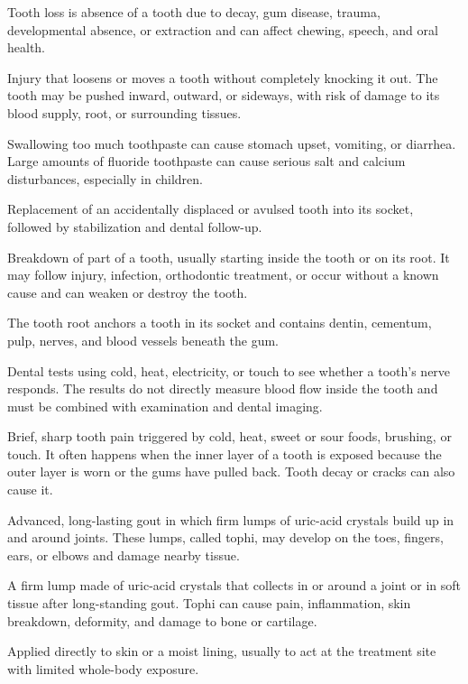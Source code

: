  Tooth loss is absence of a tooth due to decay, gum disease, trauma, developmental absence, or extraction and can affect chewing, speech, and oral health.

 Injury that loosens or moves a tooth without completely knocking it out. The tooth may be pushed inward, outward, or sideways, with risk of damage to its blood supply, root, or surrounding tissues.

 Swallowing too much toothpaste can cause stomach upset, vomiting, or diarrhea. Large amounts of fluoride toothpaste can cause serious salt and calcium disturbances, especially in children.

 Replacement of an accidentally displaced or avulsed tooth into its socket, followed by stabilization
and dental follow-up.

 Breakdown of part of a tooth, usually starting inside the tooth or on its root. It may follow injury, infection, orthodontic treatment, or occur without a known cause and can weaken or destroy the tooth.

 The tooth root anchors a tooth in its socket and contains dentin, cementum, pulp, nerves, and blood vessels beneath the gum.

 Dental tests using cold, heat, electricity, or touch to see whether a tooth’s nerve responds. The results do not directly measure blood flow inside the tooth and must be combined with examination and dental imaging.

 Brief, sharp tooth pain triggered by cold, heat, sweet or sour foods, brushing, or touch. It often happens when the inner layer of a tooth is exposed because the outer layer is worn or the gums have pulled back. Tooth decay or cracks can also cause it.

 Advanced, long-lasting gout in which firm lumps of uric-acid crystals build up in and around joints. These lumps, called tophi, may develop on the toes, fingers, ears, or elbows and damage nearby tissue.

 A firm lump made of uric-acid crystals that collects in or around a joint or in soft tissue after long-standing gout. Tophi can cause pain, inflammation, skin breakdown, deformity, and damage to bone or cartilage.

 Applied directly to skin or a moist lining, usually to act at the treatment site with limited whole-body exposure.

